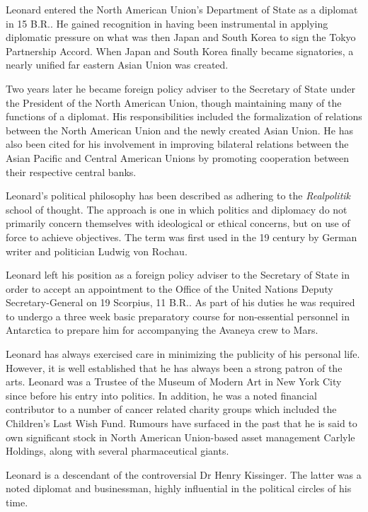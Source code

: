 Leonard entered the North American Union's Department of State as a diplomat in 15 B.R.. He gained recognition in having been instrumental in applying diplomatic pressure on what was then Japan and South Korea to sign the Tokyo Partnership Accord. When Japan and South Korea finally became signatories, a nearly unified far eastern Asian Union was created.

Two years later he became foreign policy adviser to the Secretary of State under the President of the North American Union, though maintaining many of the functions of a diplomat. His responsibilities included the formalization of relations between the North American Union and the newly created Asian Union. He has also been cited for his involvement in improving bilateral relations between the Asian Pacific and Central American Unions by promoting cooperation between their respective central banks. 

Leonard's political philosophy has been described as adhering to the {\it Realpolitik} school of thought. The approach is one in which politics and diplomacy do not primarily concern themselves with ideological or ethical concerns, but on use of force to achieve objectives. The term was first used in the 19 century by German writer and politician Ludwig von Rochau.

Leonard left his position as a foreign policy adviser to the Secretary of State in order to accept an appointment to the Office of the United Nations Deputy Secretary-General on 19 Scorpius, 11 B.R.. As part of his duties he was required to undergo a three week basic preparatory course for non-essential personnel in Antarctica to prepare him for accompanying the Avaneya crew to Mars.

Leonard has always exercised care in minimizing the publicity of his personal life. However, it is well established that he has always been a strong patron of the arts. Leonard was a Trustee of the Museum of Modern Art in New York City since before his entry into politics. In addition, he was a noted financial contributor to a number of cancer related charity groups which included the Children's Last Wish Fund. Rumours have surfaced in the past that he is said to own significant stock in North American Union-based asset management Carlyle Holdings, along with several pharmaceutical giants.

Leonard is a descendant of the controversial Dr Henry Kissinger. The latter was a noted diplomat and businessman, highly influential in the political circles of his time.

